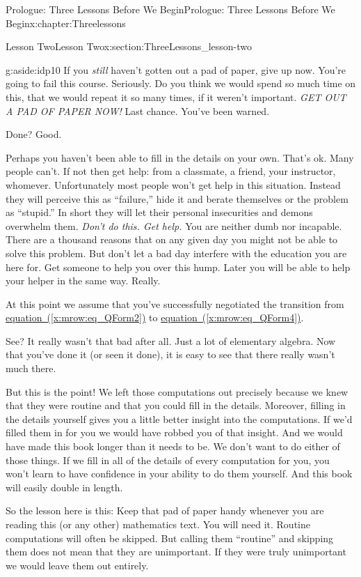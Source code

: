 \documentclass[oneside,10pt,]{book}
\newcommand{\xreffont}{\relax}
\numberwithin{equation}{section}
\begin{document}
\begin{chapterptx}{Prologue: Three Lessons Before We Begin}{}{Prologue: Three Lessons Before We Begin}{}{}{x:chapter:Threelessons}
\begin{sectionptx}{Lesson Two}{}{Lesson Two}{}{}{x:section:ThreeLessons_lesson-two}
\begin{aside}{}{g:aside:idp10}%
If you \emph{still} haven't gotten out a pad of paper, give up now. You're going to fail this course. Seriously. Do you think we would spend so much time on this, that we would repeat it so many times, if it weren't important. \emph{\emph{GET OUT A PAD OF PAPER NOW!}} Last chance. You've been warned.%
\end{aside}
Done? Good.%
\par
Perhaps you haven't been able to fill in the details on your own. That's ok. Many people can't. If not then get help: from a classmate, a friend, your instructor, whomever. Unfortunately most people won't get help in this situation. Instead they will perceive this as ``failure,'' hide it and berate themselves or the problem as ``stupid.'' In short they will let their personal insecurities and demons overwhelm them. \emph{Don't do this. Get help.} You are neither dumb nor incapable. There are a thousand reasons that on any given day you might not be able to solve this problem. But don't let a bad day interfere with the education you are here for. Get someone to help you over this hump. Later you will be able to help your helper in the same way. Really.%
\par
At this point we assume that you've successfully negotiated the transition from \hyperref[x:mrow:eq_QForm2]{equation~({\xreffont\ref{x:mrow:eq_QForm2}})} to \hyperref[x:mrow:eq_QForm4]{equation~({\xreffont\ref{x:mrow:eq_QForm4}})}.%
\par
See? It really wasn't that bad after all. Just a lot of elementary algebra. Now that you've done it (or seen it done), it is easy to see that there really wasn't much there.%
\par
But this is the point! We left those computations out precisely because we knew that they were routine and that you could fill in the details. Moreover, filling in the details yourself gives you a little better insight into the computations. If we'd filled them in for you we would have robbed you of that insight. And we would have made this book longer than it needs to be. We don't want to do either of those things. If we fill in all of the details of every computation for you, you won't learn to have confidence in your ability to do them yourself. And this book will easily double in length.%
\par
So the lesson here is this: Keep that pad of paper handy whenever you are reading this (or any other) mathematics text. You will need it. Routine computations will often be skipped. But calling them ``routine'' and skipping them does not mean that they are unimportant. If they were truly unimportant we would leave them out entirely.%

\end{sectionptx}
\end{chapterptx}
\end{document}
